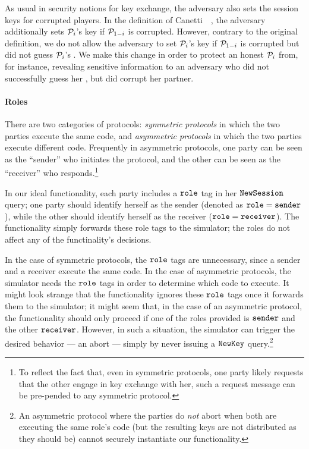 As usual in security notions for key exchange, the adversary also sets the session keys for corrupted players. 
In the definition of Canetti~\etal~\cite{EC:CHKLM05}, the adversary additionally sets $\mathcal{P}_{i}$'s key if $\mathcal{P}_{1-i}$ is corrupted.
However, contrary to the original definition, we do not allow the adversary to set $\mathcal{P}_{i}$'s key if $\mathcal{P}_{1-i}$ is corrupted but did not guess $\mathcal{P}_{i}$'s \password.
We make this change in order to protect an honest $\mathcal{P}_{i}$ from, for instance, revealing sensitive information to an adversary who did not successfully guess her \password, but did corrupt her partner.

\paragraph{Roles}
There are two categories of \fPAKE protocols: 
\emph{symmetric protocols} in which the two parties execute the same code, and 
\emph{asymmetric protocols} in which the two parties execute different code.
Frequently in asymmetric protocols, one party can be seen as the ``sender'' who initiates the protocol, and the other can be seen as the ``receiver'' who responds.\footnote{To reflect the fact that, even in symmetric protocols, one party likely requests that the other engage in key exchange with her, such a request message can be pre-pended to any symmetric protocol.}

In our ideal functionality, each party includes a $\texttt{role}$ tag in her $\texttt{NewSession}$ query; one party should identify herself as the sender (denoted as $\texttt{role} = \texttt{sender}$), while the other should identify herself as the receiver ($\texttt{role} = \texttt{receiver}$).
The functionality simply forwards these role tags to the simulator; the roles do not affect any of the functinality's decisions.

In the case of symmetric protocols, the $\texttt{role}$ tags are unnecessary, since a sender and a receiver execute the same code.
In the case of asymmetric protocols, the simulator needs the $\texttt{role}$ tags in order to determine which code to execute.
It might look strange that the functionality ignores these $\texttt{role}$ tags once it forwards them to the simulator; it might seem that, in the case of an asymmetric protocol, the functionality should only proceed if one of the roles provided is $\texttt{sender}$ and the other $\texttt{receiver}$.
However, in such a situation, the simulator can trigger the desired behavior --- an abort --- simply by never issuing a $\texttt{NewKey}$ query.\footnote{
An asymmetric protocol where the parties do \emph{not} abort when both are executing the same role's code (but the resulting keys are not distributed as they should be) cannot securely instantiate our functionality.}


